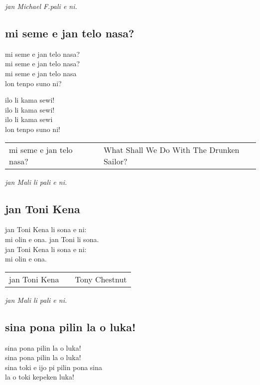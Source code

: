 \textit{jan \glqq Michael F.\grqq   pali e ni. \cite{www:failbluedot:01}}

\subsection{mi seme e jan telo nasa?}

mi seme e jan telo nasa? \\
mi seme e jan telo nasa? \\
mi seme e jan telo nasa \\
lon tenpo suno ni?

ilo li kama sewi! \\
ilo li kama sewi! \\
ilo li kama sewi \\
lon tenpo suno ni! 

\begin{supertabular}{p{5,5cm}|ll}
mi seme e jan telo nasa? && What Shall We Do With The Drunken Sailor? \\
\end{supertabular}

\textit{jan Mali li pali e ni. \cite{www:astrodonunt:01}}

\subsection{jan Toni Kena}

jan Toni Kena li sona e ni:  \\
mi olin e ona. jan Toni li sona.  \\
jan Toni Kena li sona e ni: \\
mi olin e ona.

\begin{supertabular}{p{5,5cm}|ll}
jan Toni Kena && Tony Chestnut \\
\end{supertabular}

\textit{jan Mali li pali e ni. \cite{www:astrodonunt:01}}

\subsection{sina pona pilin la o luka!}

sina pona pilin la o luka!  \\
sina pona pilin la o luka!  \\
sina toki e ijo pi pilin pona sina  \\
la o toki kepeken luka!

